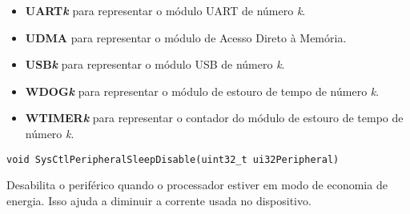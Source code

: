 \begin{description}
\begin{description}
\begin{itemize}
			\item \textbf{UART\emph{k}} para representar o módulo UART de número \emph{k}.
			\item \textbf{UDMA} para representar o módulo de Acesso Direto à Memória.
			\item \textbf{USB\emph{k}} para representar o módulo USB de número \emph{k}.
			\item \textbf{WDOG\emph{k}} para representar o módulo de estouro de tempo de número \emph{k}.
			\item \textbf{WTIMER\emph{k}} para representar o contador do módulo de estouro de tempo de número \emph{k}.
		\end{itemize}

	\end{description}
	
\end{description}

\begin{lstlisting}[style=funcao]
	void SysCtlPeripheralSleepDisable(uint32_t ui32Peripheral)
\end{lstlisting}

Desabilita o periférico quando o processador estiver em modo de economia de energia. Isso ajuda a diminuir a corrente usada no dispositivo.

